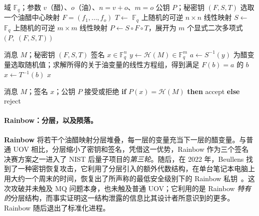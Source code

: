 \begin{algorithm}[H]
\caption{UOV 密钥生成（教学形式）}
\label{alg:uov-keygen}
\begin{algorithmic}[1]
\Require 域 $\mathbb{F}_q$；参数 $v$（醋）、$o$（油）、$n = v+o$、$m = o$
\Ensure 公钥 $P$；秘密钥 $(F, S, T)$
\State 选取一个油醋中心映射 $F = (f_1,\dots,f_o)$ 
\State $T \gets$ $\mathbb{F}_q$ 上随机的可逆 $n\times n$ 线性映射 
\State $S \gets$ $\mathbb{F}_q$ 上随机的可逆 $m\times m$ 线性映射 
\State $P \gets S \circ F \circ T$，展开为 $m$ 个显式二次多项式 
\State \Return $\big(\,P,\ (F, S, T)\,\big)$
\end{algorithmic}
\end{algorithm}

\begin{algorithm}[H]
\caption{UOV 签名（教学形式）}
\label{alg:uov-sign}
\begin{algorithmic}[1]
\Require 消息 $M$；秘密钥 $(F, S, T)$
\Ensure 签名 $x \in \mathbb{F}_q^n$
\State $y \gets \mathcal{H}(M) \in \mathbb{F}_q^m$ 
\State $a \gets S^{-1}(y)$ 
\State 为醋变量选取随机值；求解所得的关于油变量的线性方程组，得到满足 $F(b) = a$ 的 $b$ 
\State $x \gets T^{-1}(b)$ 
\State \Return $x$
\end{algorithmic}
\end{algorithm}

\begin{algorithm}[H]
\caption{UOV 验证（教学形式）}
\label{alg:uov-verify}
\begin{algorithmic}[1]
\Require 消息 $M$；签名 $x$；公钥 $P$
\Ensure 接受或拒绝
\State \textbf{if} $P(x) = \mathcal{H}(M)$ \textbf{then} \Return accept \textbf{else} \Return reject 
\end{algorithmic}
\end{algorithm}

\paragraph{Rainbow：分层，以及陨落。}
\textbf{Rainbow} 将若干个油醋映射分层堆叠，每一层的变量充当下一层的醋变量。与普通 UOV 相比，分层缩小了密钥和签名，凭借这一优势，Rainbow 作为三个签名决赛方案之一进入了 NIST 后量子项目的\emph{第三轮}。随后，在 2022 年，Beullens 找到了一种密钥恢复攻击，它利用了分层引入的额外代数结构，在单台笔记本电脑上用大约一个周末的时间，恢复出了所声称的最低安全级别下的 Rainbow 私钥~\cite{beullens2022}。这次攻破并未触及 MQ 问题本身，也未触及普通 UOV；它利用的是 Rainbow \emph{特有的}分层结构，而事实证明这一结构泄露的信息比其设计者所意识到的更多。Rainbow 随后退出了标准化进程。

